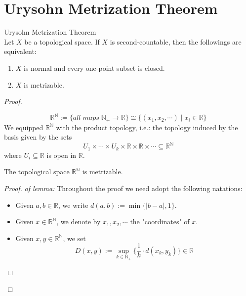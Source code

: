 \section{Urysohn Metrization Theorem}

\begin{theorem}{Urysohn Metrization Theorem}\\
Let $X$ be a topological space. If $X$ is second-countable, then the followings are equivalent:
\begin{enumerate}
    \item $X$ is normal and every one-point subset is closed.
    \item $X$ is metrizable.
\end{enumerate}
\end{theorem}

\begin{proof}
    \begin{definition}
        $$\mathbb{R}^\mathbb{N} := \{ all\;maps\;\mathbb{N}_+ \to \mathbb{R} \} \cong \{ (x_1,x_2 ,\cdots) \mid x_i \in \mathbb{R} \}$$
        We equipped $\mathbb{R}^\mathbb{N}$ with the product topology, i.e.: the topology induced by the basis given by the sets
        $$U_1 \times \cdots \times U_k \times \mathbb{R} \times \mathbb{R} \times \cdots \subseteq \mathbb{R}^\mathbb{N}$$
        where $U_i \subseteq \mathbb{R}$ is open in $\mathbb{R}$.
    \end{definition}

    \begin{lemma}
        The topological space $\mathbb{R}^\mathbb{N}$ is metrizable.
    \end{lemma}

    \begin{proof}
        \textit{of lemma:} Throughout the proof we need adopt the following natations:
        \begin{itemize}
            \item Given $a,b \in \mathbb{R}$, we write $d(a,b) := \min \{ |b-a|,1 \}$.
            \item Given $x \in \mathbb{R}^\mathbb{N}$, we denote by $x_1,x_2 ,\cdots$ the "coordinates" of $x$.
            \item Given $x,y \in \mathbb{R}^\mathbb{N}$, we set
            $$D(x,y) := \sup_{k \in \mathbb{N}_+} \{ \frac{1}{k} \cdot d(x_k, y_k) \} \in \mathbb{R}$$
        \end{itemize}


\end{proof}
\end{proof}
